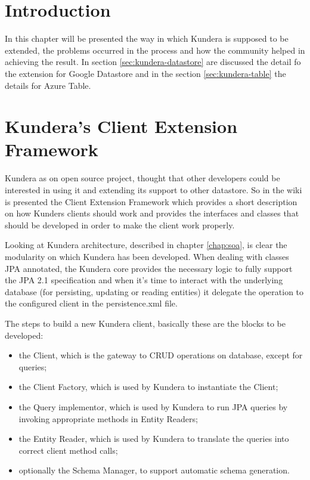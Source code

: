 \section{Introduction}
In this chapter will be presented the way in which Kundera is supposed to be extended, the problems occurred in the process and how the community helped in achieving the result.
In section \ref{sec:kundera-datastore} are discussed the detail fo the extension for Google Datastore and in the section \ref{sec:kundera-table} the details for Azure Table.

\section{Kundera's Client Extension Framework}
Kundera as on open source project, thought that other developers could be interested in using it and extending its support to other datastore.
So in the wiki is presented the Client Extension Framework which provides a short description on how Kunders clients should work and provides the interfaces and classes that should be developed in order to make the client work properly.

Looking at Kundera architecture, described in chapter \ref{chap:soa}, is clear the modularity on which Kundera has been developed. When dealing with classes JPA annotated, the Kundera core provides the necessary logic to fully support the JPA 2.1 specification and when it's time to interact with the underlying database (for persisting, updating or reading entities) it delegate the operation to the configured client in the persistence.xml file.

The steps to build a new Kundera client, basically these are the blocks to be developed:
\begin{itemize}
\item the Client, which is the gateway to CRUD operations on database, except for queries;
\item the Client Factory, which is used by Kundera to instantiate the Client;
\item the Query implementor, which is used by Kundera to run JPA queries by invoking appropriate
methods in Entity Readers;
\item the Entity Reader, which is used by Kundera to translate the queries into correct client
method calls;
\item optionally the Schema Manager, to support automatic schema generation.
\end{itemize}

